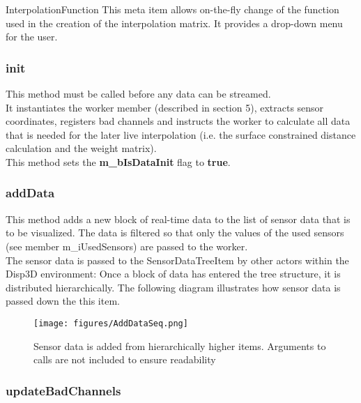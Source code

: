\begin{aims}
	\item[\hspace*{11mm} InterpolationFunction] This meta item allows on-the-fly change of the function used in the creation of the interpolation matrix. It provides a drop-down menu for the user.
\end{aims}

\subsubsection{init}

This method must be called before any data can be streamed.\\
It instantiates the worker member (described in section 5), extracts sensor coordinates, registers bad channels and instructs the worker to calculate all data that is needed for the later live interpolation (i.e. the surface constrained distance calculation and the weight matrix).\\
This method sets the \textbf{m\_bIsDataInit} flag to \textbf{true}.

\subsubsection{addData}

This method adds a new block of real-time data to the list of sensor data that is to be visualized. The data is filtered so that only the values of the used sensors (see member m\_iUsedSensors) are passed to the worker.\\
The sensor data is passed to the SensorDataTreeItem by other actors within the Disp3D environment: Once a block of data has entered the tree structure, it is distributed hierarchically. The following diagram illustrates how sensor data is passed down the this item.

\clearpage

\begin{figure}[h]
	\begin{center}
		\texttt{[image: figures/AddDataSeq.png]}
		\caption{Sensor data is added from hierarchically higher items. Arguments to calls are not included to ensure readability}
	\end{center}
\end{figure}

\subsubsection{updateBadChannels}

